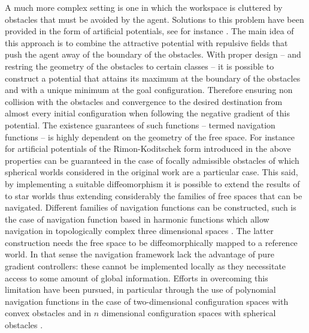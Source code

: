 \documentclass[article]{IEEEtran}
\theoremstyle{definition}
\begin{document}
A much more complex setting is one in which the workspace is cluttered by obstacles that must be avoided by the agent. Solutions to this problem have been provided in the form of artificial potentials, see for instance \cite{koditschek1990robot,  rimon1992exact,khatib1980commande, Khatib:1986:ROA:6806.6812, lozano1987handey, newman1987high,barraquand1992numerical, khosla1988superquadric, barraquand1990monte,connolly1990path,krogh1984generalized,warren1989global,lionis2007locally,lionis2008towards,filippidis2011adjustable,filippidis2012navigation,filippidis2013navigation}. The main idea of this approach is to combine the attractive potential with repulsive fields that push the agent away of the boundary of the obstacles. With proper design -- and restring the geometry of the obstacles to certain classes -- it is possible to construct a potential that attains its maximum at the boundary of the obstacles and with a unique minimum at the goal configuration. Therefore ensuring non collision with the obstacles and convergence to the desired destination from almost every initial configuration when following the negative gradient of this potential. The existence guarantees of such functions -- termed navigation functions -- is highly dependent on the geometry of the free space. For instance for artificial potentials of the  Rimon-Koditschek form introduced in \cite{koditschek1990robot} the above properties can be guaranteed in the case of focally admissible obstacles \cite{filippidis2013navigation} of which spherical worlds considered in the original work \cite{koditschek1990robot} are a particular case. This said, by implementing a suitable diffeomorphism it is possible to extend the results of \cite{koditschek1990robot} to star worlds \cite{rimon1992exact,rimon1991construction} thus extending considerably the families of free spaces that can be navigated. Different families of navigation functions can be constructed, such is the case of navigation function based in harmonic functions which allow navigation in topologically complex three dimensional spaces \cite{loizou2011closed,loizou2012navigation}. The latter construction needs the free space to be diffeomorphically mapped to a reference world. In that sense the navigation framework lack the advantage of pure gradient controllers: these cannot be implemented locally as they necessitate access to some amount of global information. Efforts in overcoming this limitation have been pursued, in particular through the use of polynomial navigation functions in the case of two-dimensional configuration spaces with convex obstacles \cite{lionis2007locally, lionis2008towards} and in $n$ dimensional configuration spaces with spherical obstacles \cite{filippidis2011adjustable}.
\end{document}
